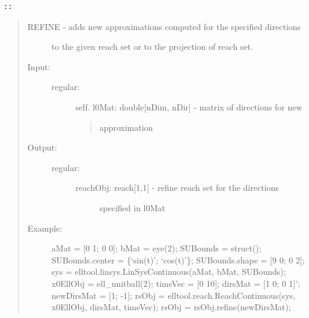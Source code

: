 \documentclass[letterpaper,10pt,english]{sphinxmanual}
\begin{document}
\begin{Verbatim}[commandchars=\\\{\}]
::
\end{Verbatim}
\begin{quote}
\begin{description}
\item[{REFINE - adds new approximations computed for the specified directions}] \leavevmode
to the given reach set or to the projection of reach set.

\item[{Input:}] \leavevmode\begin{description}
\item[{regular:}] \leavevmode
self.
l0Mat: double{[}nDim, nDir{]} - matrix of directions for new
\begin{quote}

approximation
\end{quote}

\end{description}

\item[{Output:}] \leavevmode\begin{description}
\item[{regular:}] \leavevmode\begin{description}
\item[{reachObj: reach{[}1,1{]} - refine reach set for the directions}] \leavevmode
specified in l0Mat

\end{description}

\end{description}

\item[{Example:}] \leavevmode
aMat = {[}0 1; 0 0{]}; bMat = eye(2);
SUBounds = struct();
SUBounds.center = \{`sin(t)'; `cos(t)'\};
SUBounds.shape = {[}9 0; 0 2{]};
sys = elltool.linsys.LinSysContinuous(aMat, bMat, SUBounds);
x0EllObj = ell\_unitball(2);
timeVec = {[}0 10{]};
dirsMat = {[}1 0; 0 1{]}';
newDirsMat = {[}1; -1{]};
rsObj = elltool.reach.ReachContinuous(sys, x0EllObj, dirsMat, timeVec);
rsObj = rsObj.refine(newDirsMat);

\end{description}
\end{quote}
\end{document}
